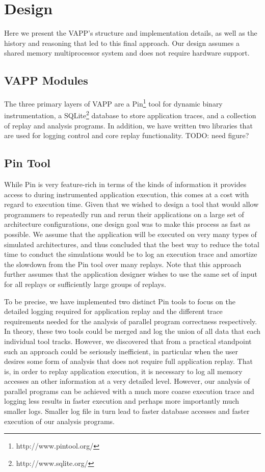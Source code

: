 \section{Design}
Here we present the VAPP's structure and implementation details,
as well as the history and reasoning that led to this final approach.
Our design assumes a shared memory multiprocessor system and does
not require hardware support.

\subsection{VAPP Modules}
The three primary layers of VAPP are a Pin\footnote{http://www.pintool.org/}
tool for dynamic binary instrumentation, a SQLite\footnote{http://www.sqlite.org/}
database to store application traces, and a collection of replay and analysis
programs. In addition, we have written two libraries that are used for logging
control and core replay functionality. TODO: need figure?

\subsection{Pin Tool}
While Pin is very feature-rich in terms of the kinds of information
it provides access to during instrumented application execution, this
comes at a cost with regard to execution time.  Given that we wished to
design a tool that would allow programmers to repeatedly run and rerun
their applications on a large set of architecture configurations,
one design goal was to make this process as fast as possible.  We assume
that the application will be executed on very many types of simulated
architectures, and thus concluded that the best way to reduce the
total time to conduct the simulations would be to log an execution trace
and amortize the slowdown from the Pin tool over many replays.  Note that
this approach further assumes that the application designer wishes to
use the same set of input for all replays or sufficiently large
groups of replays.

To be precise, we have implemented two distinct Pin tools to focus
on the detailed logging required for application replay and the
different trace requirements needed for the analysis of parallel
program correctness respectively.  In theory, these two tools could
be merged and log the union of all data that each individual tool
tracks.  However, we discovered that from a practical standpoint
such an approach could be seriously inefficient, in particular
when the user desires some form of analysis that does not
require full application replay.  That is, in order to replay
application execution, it is necessary to log all memory accesses
an other information at a very detailed level.  However, our
analysis of parallel programs can be achieved with a much more
coarse execution trace and logging less results in faster execution
and perhaps more importantly much smaller logs.  Smaller log file in
turn lead to faster database accesses and faster execution of our
analysis programs.

